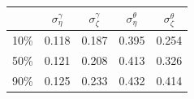 \begin{tabular}{ccccc}
\hline
 & $\sigma_{\eta}^{\gamma}$ & $\sigma_{\zeta}^{\gamma}$ & $\sigma_{\eta}^{\theta}$ & $\sigma_{\zeta}^{\theta}$ \\
\hline
10\% &  0.118 & 0.187 & 0.395 & 0.254  \\
50\% & 0.121 & 0.208  & 0.413 & 0.326  \\
90\% &  0.125 & 0.233  & 0.432 & 0.414\\
\hline
\end{tabular}